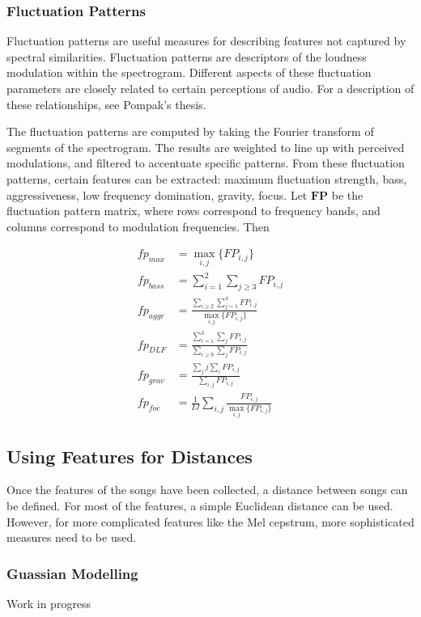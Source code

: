 \documentclass[12pt]{article}
\begin{document}
\subsubsection{Fluctuation Patterns}

Fluctuation patterns are useful measures for describing features not captured by spectral similarities.  Fluctuation patterns are descriptors of the loudness modulation within the spectrogram.  Different aspects of these fluctuation parameters are closely related to certain perceptions of audio.  For a description of these relationships, see Pompak's thesis.

The fluctuation patterns are computed by taking the Fourier transform of segments of the spectrogram.  The results are weighted to line up with perceived modulations, and filtered to accentuate specific patterns.  From these fluctuation patterns, certain features can be extracted: maximum fluctuation strength, bass, aggressiveness, low frequency domination, gravity, focus.  Let $\mathbf{FP}$ be the fluctuation pattern matrix, where rows correspond to frequency bands, and columns correspond to modulation frequencies.  Then

\begin{align*}
fp_{max} &= \max_{i,j} \{ FP_{i,j} \} \\
fp_{bass} &= \sum_{i=1}^2 \sum_{j \geq 3} FP_{i,j} \\
fp_{aggr} &= \frac{\sum_{i \geq 2} \sum_{j=1}^4 FP_{i,j} }{ \max_{i,j} \{ FP_{i,j} \}} \\
fp_{DLF} &= \frac{ \sum_{i=1}^3 \sum_j FP_{i,j} }{ \sum_{i\geq 9} \sum_j FP_{i,j} } \\
fp_{grav} &= \frac{ \sum_j j \sum_{i} FP_{i,j} }{ \sum_{i,j} FP_{i,j} } \\
fp_{foc} &= \frac{1}{I J} \sum_{i,j} \frac{FP_{i,j}}{ \max_{i,j} \{ FP_{i,j} \} }
\end{align*}

\subsection{Using Features for Distances}

Once the features of the songs have been collected, a distance between songs can be defined.  For most of the features, a simple Euclidean distance can be used.  However, for more complicated features like the Mel cepstrum, more sophisticated measures need to be used.

\subsubsection{Guassian Modelling}
Work in progress
\end{document}
